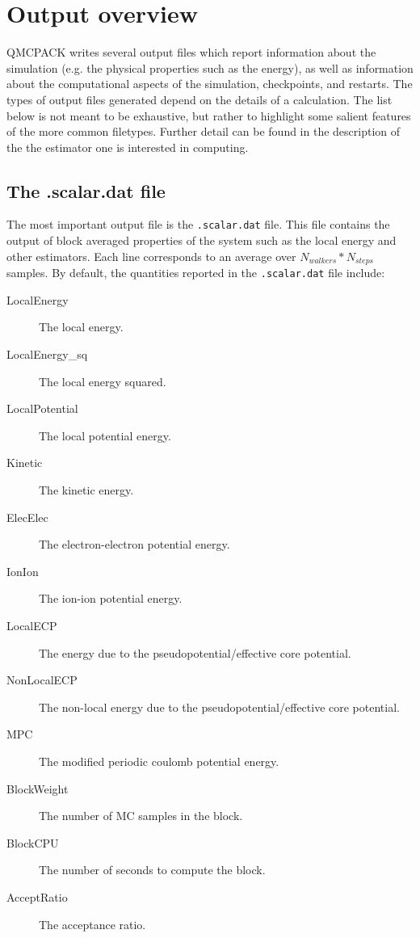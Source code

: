 \chapter{Output overview}
\label{chap:output_overview}

QMCPACK writes several output files which report information about the simulation (e.g. the physical properties such as the energy), as well as information about the computational aspects of the simulation, checkpoints, and restarts.
The types of output files generated depend on the details of a calculation. The list below is not meant to be exhaustive, but rather to highlight some salient features of the more common filetypes. Further detail can be found in the description of the the estimator one is interested in computing.


\section{The .scalar.dat file}
\label{sec:scalardat_file}
The most important output file is the \texttt{.scalar.dat} file. This file contains the output of block averaged properties of the system such as the local energy and other estimators.
Each line corresponds to an average over $N_{walkers}*N_{steps}$ samples.
By default, the quantities reported in the \texttt{.scalar.dat} file include:

\begin{description}
\item[LocalEnergy] The local energy.
\item[LocalEnergy\_sq] The local energy squared.
\item[LocalPotential] The local potential energy.
\item[Kinetic] The kinetic energy.
\item[ElecElec] The electron-electron potential energy.
\item[IonIon] The ion-ion potential energy.
\item[LocalECP] The energy due to the pseudopotential/effective core potential.
\item[NonLocalECP] The non-local energy due to the pseudopotential/effective core potential.
\item[MPC] The modified periodic coulomb potential energy.
\item[BlockWeight] The number of MC samples in the block.
\item[BlockCPU] The number of seconds to compute the block.
\item[AcceptRatio] The acceptance ratio.
\end{description}

